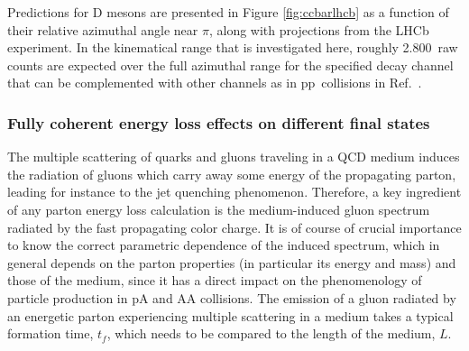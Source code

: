 \documentclass[../report.tex]{subfiles}
\begin{document}
Predictions for D mesons are presented in Figure \ref{fig:ccbarlhcb} as a function of their relative azimuthal angle near $\pi$, along with projections from the LHCb experiment. In the \pPb kinematical range that is investigated here, roughly 2.800~raw counts are expected over the full azimuthal range for the specified decay channel that can be complemented with other channels as in pp~collisions in Ref.~\cite{Aaij:2012dz}. %




\subsubsection{Fully coherent energy loss effects on different final states}
\label{subsubsec:coherent}

The multiple scattering of quarks and gluons traveling in a QCD medium induces the radiation of gluons which carry away some energy of the propagating parton, leading for instance to the jet quenching phenomenon. Therefore, a key ingredient of any parton energy loss calculation is  the medium-induced gluon spectrum radiated by the fast propagating color charge. It is of course of crucial importance to know the correct parametric dependence of the induced spectrum, which in general depends on the parton properties (in particular its energy and mass) and those of the medium, since it has a direct impact on the phenomenology of particle production in pA and AA collisions. The emission of a gluon radiated by an energetic parton experiencing multiple scattering in a medium takes a typical formation time, $t_f$, which needs to be compared to the length of the medium, $L$.
\end{document}
